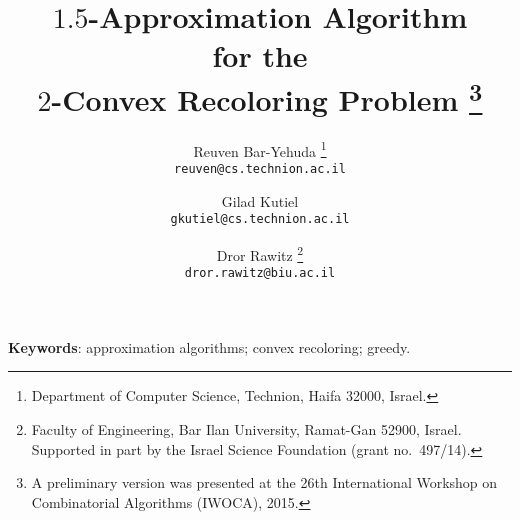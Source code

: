 \title{\bf $1.5$-Approximation Algorithm	\\
for the 									\\ 
$2$-Convex Recoloring Problem%
\thanks{A preliminary version was presented at the 26th
International Workshop on Combinatorial Algorithms (IWOCA), 2015.}
}

\begin{titlepage}

\author{%
Reuven Bar-Yehuda%
\thanks{Department of Computer Science, Technion, Haifa 32000, Israel.}
\\
{\tt\small reuven@cs.technion.ac.il}
\and
Gilad Kutiel\footnotemark[2] \\
{\tt\small gkutiel@cs.technion.ac.il}
\and
Dror Rawitz%
\thanks{Faculty of Engineering, Bar Ilan University, Ramat-Gan 52900,
Israel.  Supported in part by the Israel Science Foundation (grant
no.~497/14).} \\
{\tt\small dror.rawitz@biu.ac.il}
%
}

\maketitle



\medskip

\noindent
\textbf{Keywords}:
approximation algorithms; convex recoloring; greedy.

\renewcommand{\thepage}{}
\end{titlepage}


